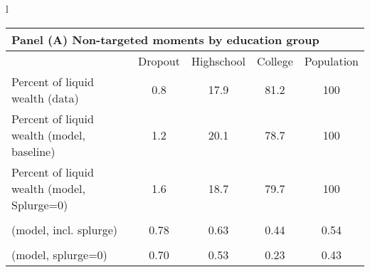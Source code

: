 \documentclass[\econtexRoot/HAFiscal]{subfiles}
\begin{document}
\begin{table}[th]
	\begin{center}
		\begin{tabular}{l}
			\begin{tabular}{lcccc}
				\multicolumn{5}{l}{Panel (A) Non-targeted moments by education group} \\ \midrule
				& Dropout & Highschool & College & Population \\ \midrule
				Percent of liquid wealth (data) & 0.8 & 17.9 & 81.2 & 100 \\
				Percent of liquid wealth (model, baseline) & 1.2 & 20.1 & 78.7 & 100 \\
				Percent of liquid wealth (model, Splurge=0) & 1.6 & 18.7 & 79.7 & 100 \\
				\makecell[l]{Avg. lottery-win-year MPC \\ (model, incl. splurge)} & 0.78 & 0.63 & 0.44 & 0.54 \\ 
				\makecell[l]{Avg. lottery-win-year MPC \\ (model, splurge=0)} & 0.70 & 0.53 & 0.23 & 0.43
				\\ \bottomrule 
			\end{tabular} \\ \\ 
			

\end{tabular}
\end{center}
\end{table}
\end{document}
